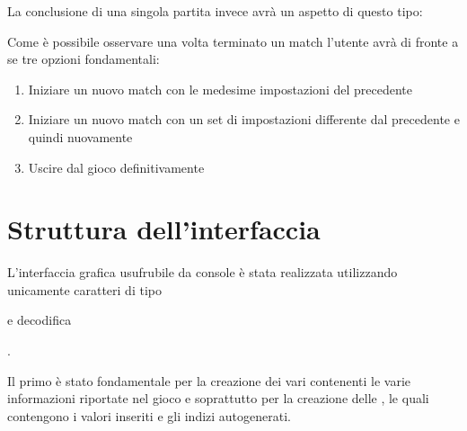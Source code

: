 \documentclass[letterpaper,10pt,italian,openany,oneside]{sphinxmanual}
\begin{document}
\noindent{}

La conclusione di una singola partita invece avrà un aspetto di questo tipo:

\noindent{}

Come è possibile osservare una volta terminato un match l’utente avrà di fronte a se tre opzioni fondamentali:
\begin{enumerate}
\def\theenumi{\arabic{enumi}}
\def\labelenumi{\theenumi )}
\makeatletter\def\p@enumii{\p@enumi \theenumi )}\makeatother
\item {} 
Iniziare un nuovo match con le medesime impostazioni del precedente

\item {} 
Iniziare un nuovo match con un set di impostazioni differente dal precedente e quindi  nuovamente

\item {} 
Uscire dal gioco definitivamente

\end{enumerate}


\section{Struttura dell’interfaccia}
\label{\detokenize{gameguide:struttura-dell-interfaccia}}
L’interfaccia grafica usufrubile da console è stata realizzata utilizzando unicamente caratteri di tipo  %
\begin{footnote}[3]\sphinxAtStartFootnote
{}
%
\end{footnote} e decodifica  %
\begin{footnote}[4]\sphinxAtStartFootnote
{}
%
\end{footnote}.

Il primo è stato fondamentale per la creazione dei vari  contenenti le varie informazioni riportate nel gioco e soprattutto per la creazione delle , le quali contengono i valori inseriti e gli indizi autogenerati.
\end{document}
